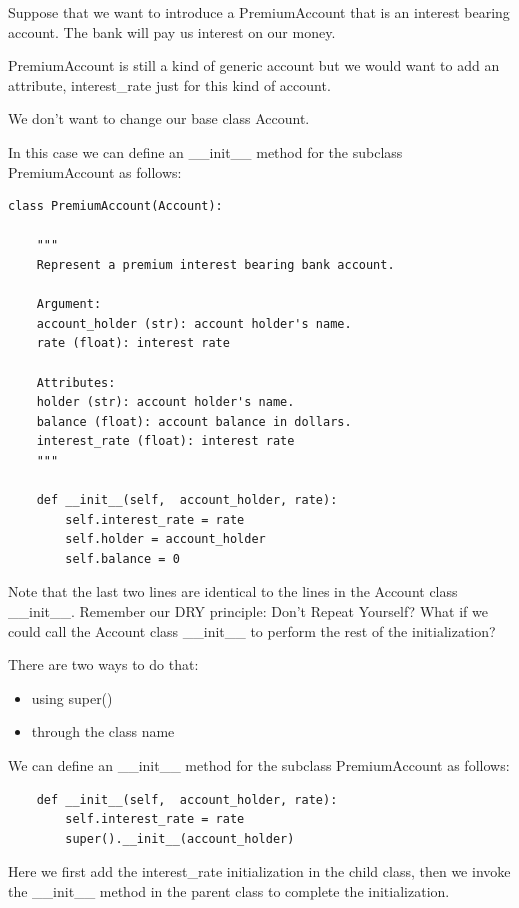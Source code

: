 \documentclass{article}
\begin{document}
Suppose that we want to introduce a PremiumAccount that is an interest bearing account.  The bank will pay us interest on our money.

PremiumAccount is still a kind of generic account but we would want to add an attribute, interest{\_}rate just for this kind of account.

We don’t want to change our base class Account.

In this case we can define an {\_}{\_}init{\_}{\_}  method for the subclass PremiumAccount as follows:

\begin{lstlisting}
class PremiumAccount(Account):
 
    """
    Represent a premium interest bearing bank account.
 
    Argument:
    account_holder (str): account holder's name.
    rate (float): interest rate
 
    Attributes:
    holder (str): account holder's name.
    balance (float): account balance in dollars.
    interest_rate (float): interest rate
    """
 
    def __init__(self,  account_holder, rate):
        self.interest_rate = rate
        self.holder = account_holder
        self.balance = 0
\end{lstlisting}

Note that the last two lines are identical to the lines in the Account class {\_}{\_}init{\_}{\_}.
Remember our DRY principle: Don’t Repeat Yourself?
What if we could call the Account class {\_}{\_}init{\_}{\_} to perform the rest of the initialization? 

There are two ways to do that:
\begin{itemize}
\item using super()
\item through the class name
\end{itemize}

We can define an {\_}{\_}init{\_}{\_}  method for the subclass PremiumAccount as follows:

\begin{lstlisting}
    def __init__(self,  account_holder, rate):
        self.interest_rate = rate
        super().__init__(account_holder)
\end{lstlisting}
   
Here we first add the interest{\_}rate initialization in the child class, then we  invoke the {\_}{\_}init{\_}{\_} method in the parent class to complete the initialization.
\end{document}
